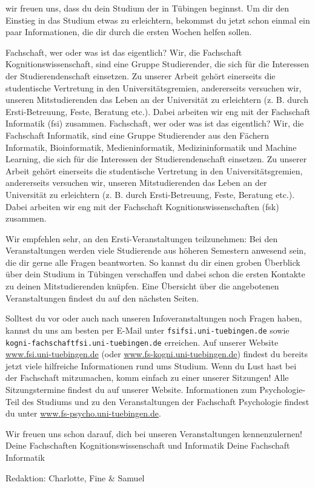\thispagestyle{firststyle}
wir freuen uns, dass du dein Studium der \studiengang in Tübingen beginnst.
Um dir den Einstieg in das Studium etwas zu erleichtern, bekommst du jetzt schon einmal
ein paar Informationen, die dir durch die ersten Wochen helfen sollen.

\ifkogwiss
\glqq Fachschaft\grqq, wer oder was ist das eigentlich? Wir, die Fachschaft Kognitionswissenschaft,
sind eine Gruppe Studierender, die sich für die Interessen der Studierendenschaft einsetzen. Zu unserer Arbeit
gehört einerseits die studentische Vertretung in den Universitätsgremien, andererseits versuchen wir, unseren
Mitstudierenden das Leben an der Universität zu erleichtern (z. B. durch Ersti-Betreuung, Feste, Beratung etc.).
Dabei arbeiten wir eng mit der Fachschaft Informatik (fsi) zusammen.
\else
\glqq Fachschaft\grqq, wer oder was ist das eigentlich? Wir, die Fachschaft Informatik, sind eine Gruppe Studierender aus den Fächern
Informatik, Bioinformatik, Medieninformatik, Medizininformatik und Machine Learning, die sich für die Interessen der Studierendenschaft einsetzen. Zu unserer Arbeit
gehört einerseits die studentische Vertretung in den Universitätsgremien, andererseits versuchen wir, unseren
Mitstudierenden das Leben an der Universität zu erleichtern (z. B. durch Ersti-Betreuung, Feste, Beratung etc.).
Dabei arbeiten wir eng mit der Fachschaft Kognitionswissenschaften (fsk) zusammen.
\fi

Wir empfehlen sehr, an den Ersti-Veranstaltungen teilzunehmen:
Bei den Veranstaltungen werden viele Studierende aus höheren Semestern anwesend sein, die dir gerne alle Fragen beantworten.
So kannst du dir einen groben Überblick über dein Studium in Tübingen verschaffen und dabei schon die ersten Kontakte zu deinen Mitstudierenden knüpfen.
Eine Übersicht über die angebotenen Veranstaltungen findest du auf den nächsten Seiten.

Solltest du vor oder auch nach unseren Infoveranstaltungen noch Fragen haben, kannst du uns
am besten per E-Mail unter \texttt{fsi\At fsi.uni-tuebingen.de}
\ifkogwiss
sowie \texttt{kogni-fachschaft\At fsi.uni-tuebingen.de}
\fi
erreichen.
Auf unserer Website \url{www.fsi.uni-tuebingen.de} (oder \url{www.fs-kogni.uni-tuebingen.de}) findest du bereits
jetzt viele hilfreiche Informationen rund ums Studium. Wenn du Lust hast bei der Fachschaft mitzumachen,
komm einfach zu einer unserer Sitzungen! Alle Sitzungstermine findest du auf unserer Website.
\ifkogwiss  Informationen zum Psychologie-Teil des Studiums und zu den Veranstaltungen der
Fachschaft Psychologie findest du unter \url{www.fs-psycho.uni-tuebingen.de}.\fi

\enlargethispage{3\baselineskip} %
Wir freuen uns schon darauf, dich bei unseren Veranstaltungen kennenzulernen!\\
\ifkogwiss
Deine Fachschaften Kognitionswissenschaft und Informatik
\else
Deine Fachschaft Informatik
\par\hfill
{\footnotesize Redaktion: Charlotte, Fine \& Samuel}
\fi
\vfill
